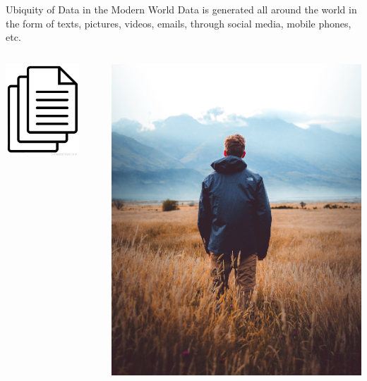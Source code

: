 \documentclass[aspectratio=169,xcolor=dvipsnames,svgnames,x11names,fleqn]{beamer}
\begin{document}

\begin{frame}{Ubiquity of Data in the Modern World}
Data is generated all around the world in the form of texts, pictures, videos, emails, through social media, mobile phones, etc.

    \begin{columns}[c] %

        \includegraphics[width=0.8\textwidth]{figures/document.png}

        \includegraphics[width=.8\textwidth]{figures/image.jpg}


\end{columns}
\end{frame}
\end{document}

